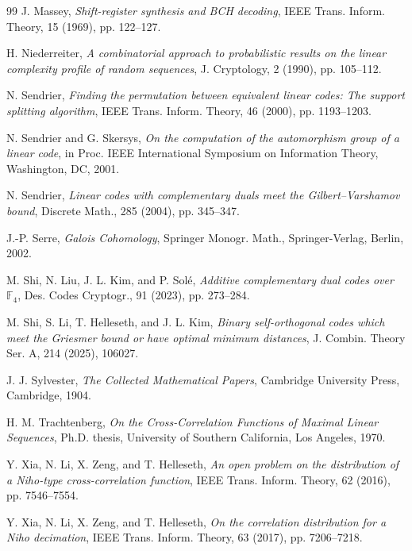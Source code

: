 \documentclass[hidelinks,onefignum,onetabnum]{siamart251216}
\theoremstyle{definition}
\theoremstyle{remark}
\begin{document}
\begin{thebibliography}{99}
	J. Massey, \emph{Shift-register synthesis and BCH decoding}, IEEE Trans. Inform. Theory, 15 (1969), pp. 122--127.
	
	H. Niederreiter, \emph{A combinatorial approach to probabilistic results on the linear complexity profile of random sequences}, J. Cryptology, 2 (1990), pp. 105--112.
	
	N. Sendrier, \emph{Finding the permutation between equivalent linear codes: The support splitting algorithm}, IEEE Trans. Inform. Theory, 46 (2000), pp. 1193--1203.
	
	N. Sendrier and G. Skersys, \emph{On the computation of the automorphism group of a linear code}, in Proc. IEEE International Symposium on Information Theory, Washington, DC, 2001.
	
	N. Sendrier, \emph{Linear codes with complementary duals meet the Gilbert--Varshamov bound}, Discrete Math., 285 (2004), pp. 345--347.
	
	J.-P. Serre, \emph{Galois Cohomology}, Springer Monogr. Math., Springer-Verlag, Berlin, 2002.
	
	M. Shi, N. Liu, J. L. Kim, and P. Sol{\'e}, \emph{Additive complementary dual codes over $\mathbb{F}_4$}, Des. Codes Cryptogr., 91 (2023), pp. 273--284.
	
	M. Shi, S. Li, T. Helleseth, and J. L. Kim, \emph{Binary self-orthogonal codes which meet the Griesmer bound or have optimal minimum distances}, J. Combin. Theory Ser. A, 214 (2025), 106027.
	
	J. J. Sylvester, \emph{The Collected Mathematical Papers}, Cambridge University Press, Cambridge, 1904.
	
	H. M. Trachtenberg, \emph{On the Cross-Correlation Functions of Maximal Linear Sequences}, Ph.D. thesis, University of Southern California, Los Angeles, 1970.
	
	Y. Xia, N. Li, X. Zeng, and T. Helleseth, \emph{An open problem on the distribution of a Niho-type cross-correlation function}, IEEE Trans. Inform. Theory, 62 (2016), pp. 7546--7554.
	
	Y. Xia, N. Li, X. Zeng, and T. Helleseth, \emph{On the correlation distribution for a Niho decimation}, IEEE Trans. Inform. Theory, 63 (2017), pp. 7206--7218.
	

\end{thebibliography}
\end{document}
